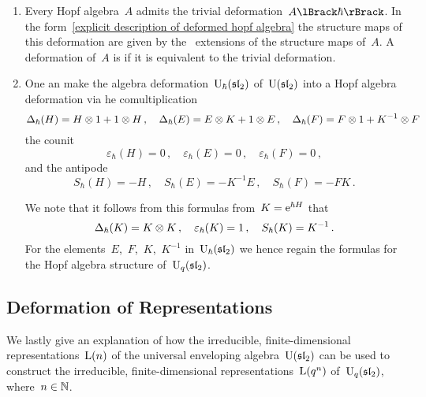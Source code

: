 \documentclass[a4paper, 11pt, oneside]{scrartcl}
\begin{document}
\begin{example}
  \leavevmode
  \begin{enumerate}
    \item
      Every Hopf algebra~$A$ admits the trivial deformation~$\power{A}{\hbar}$.
      In the form~\eqref{explicit description of deformed hopf algebra} the structure maps of this deformation are given by the~\linear{$\kfhbar$} extensions of the structure maps of~$A$.
      A deformation of~$A$ is  if it is equivalent to the trivial deformation.
    \item
      One an make the algebra deformation~$\operatorname{U}_{\hbar}(\mathfrak{sl}_2)$ of~$\operatorname{U}(\mathfrak{sl}_2)$ into a Hopf algebra deformation via he comultiplication
      \[
        \Delta_{\hbar}(H) = H \otimes 1 + 1 \otimes H \,,
        \quad
        \Delta_{\hbar}(E) = E \otimes K + 1 \otimes E \,,
        \quad
        \Delta_{\hbar}(F) = F \otimes 1 + K^{-1} \otimes F \,
      \]
      the counit
      \[
        \varepsilon_{\hbar}(H) = 0 \,,
        \quad
        \varepsilon_{\hbar}(E) = 0 \,,
        \quad
        \varepsilon_{\hbar}(F) = 0 \,,
      \]
      and the antipode
      \[
        S_{\hbar}(H) = - H \,,
        \quad
        S_{\hbar}(E) = - K^{-1} E \,,
        \quad
        S_{\hbar}(F) = - F K \,.
      \]

      We note that it follows from this formulas from~$K = \mathrm{e}^{\hbar H}$ that
      \[
        \Delta_{\hbar}(K) = K \otimes K \,,
        \quad
        \varepsilon_{\hbar}(K) = 1 \,,
        \quad
        S_{\hbar}(K) = K^{-1} \,.
      \]
      For the elements~$E$,~$F$,~$K$,~$K^{-1}$ in~$\operatorname{U}_{\hbar}(\mathfrak{sl}_2)$ we hence regain the formulas for the Hopf algebra structure of~$\operatorname{U}_q(\mathfrak{sl}_2)$.
  \end{enumerate}
\end{example}



\subsection{Deformation of Representations}

We lastly give an explanation of how the irreducible, finite-dimensional representations~$\operatorname{L}(n)$ of the universal enveloping algebra~$\operatorname{U}(\mathfrak{sl}_2)$ can be used to construct the irreducible, finite-dimensional representations~$\operatorname{L}(q^n)$ of~$\operatorname{U}_q(\mathfrak{sl}_2)$, where~$n \in \mathbb{N}$.
\end{document}
